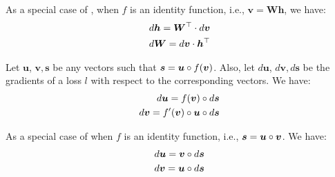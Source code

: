 \begin{corollary}
\label{c:chain_rule}
As a special case of , when $f$ is an identity function,
i.e., $\bm{v} = \bm{Wh}$, we have:
\begin{align}
d\bm{h} = \bm{W}^\top \cdot d\bm{v}
\\
d\bm{W} = d\bm{v} \cdot \bm{h}^\top 
\end{align}
\end{corollary}

\begin{remark}
\label{r:edot_der}
Let $\bm{u}$, $\bm{v}, \bm{s}$ be any vectors such that  $\bm{s} = \bm{u} \circ
f(\bm{v})$. Also, let $d\bm{u}$, $d\bm{v}, d\bm{s}$ be the gradients of a loss $l$ with
respect to the corresponding vectors. We have:
\begin{align}
d\bm{u} = f(\bm{v}) \circ d\bm{s} \\
d\bm{v} = f'(\bm{v}) \circ \bm{u} \circ d\bm{s} 
\end{align}
\end{remark}


\begin{remark}
\label{r:edot_der2}
As a special case of  when $f$ is an identity function,
i.e.,  $\bm{s} = \bm{u} \circ \bm{v}$. We have:
\begin{align}
d\bm{u} = \bm{v} \circ d\bm{s} \\
d\bm{v} = \bm{u} \circ d\bm{s} 
\end{align}
\end{remark}



